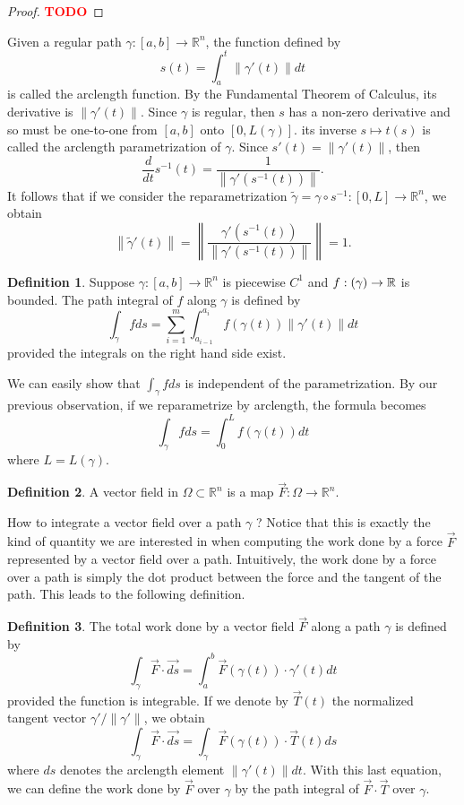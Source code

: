 \documentclass{article}
\theoremstyle{plain}
\theoremstyle{definition}
\newtheorem*{definition}{Definition}
\newcommand{\R}{\mathbb{R}}
\let\Im\relax
\DeclareMathOperator{\Im}{Im}
\newcommand{\td}{\textcolor{red}{\textbf{TODO}}}
\newcommand{\norm}[1]{\left\lVert#1 \right\rVert}
\begin{document}
\begin{proof}
    \td 
\end{proof}

Given a regular path $\gamma : [a,b] \to \R^n$, the function defined by
$$s(t) = \int_{a}^{t}\norm{\gamma'(t)}dt$$
is called the arclength function. By the Fundamental Theorem of Calculus, its derivative is $\norm{\gamma'(t)}$. Since $\gamma$ is regular, then $s$ has a non-zero derivative and so must be one-to-one from $[a,b]$ onto $[0, L(\gamma)]$. its inverse $s \mapsto t(s)$ is called the arclength parametrization of $\gamma$. Since $s'(t) = \norm{\gamma'(t)}$, then
$$\frac{d}{dt}s^{-1}(t) = \frac{1}{\norm{\gamma'(s^{-1}(t))}}.$$
It follows that if we consider the reparametrization $\tilde\gamma = \gamma \circ s^{-1} : [0,L] \to \R^n$, we obtain
$$\norm{\tilde\gamma'(t)} = \norm{\frac{\gamma'(s^{-1}(t))}{\norm{\gamma'(s^{-1}(t))}}} = 1.$$

\begin{definition}
    Suppose $\gamma : [a,b] \to \R^n$ is piecewise $C^1$ and $f : \Im (\gamma) \to \R$ is bounded. The path integral of $f$ along $\gamma$ is defined by
    $$\int_{\gamma}fds = \sum_{i=1}^{m}\int_{a_{i-1}}^{a_{i}}f(\gamma(t))\norm{\gamma'(t)}dt$$
    provided the integrals on the right hand side exist.
\end{definition}

We can easily show that $\int_{\gamma}fds$ is independent of the parametrization. By our previous observation, if we reparametrize by arclength, the formula becomes
$$\int_{\gamma}fds = \int_{0}^{L}f(\gamma(t))dt$$
where $L = L(\gamma)$.

\begin{definition}
    A vector field in $\Omega \subset \R^n$ is a map $\vec{F} : \Omega \to \R^n$.
\end{definition}

How to integrate a vector field over a path $\gamma$ ? Notice that this is exactly the kind of quantity we are interested in when computing the work done by a force $\vec{F}$ represented by a vector field over a path. Intuitively, the work done by a force over a path is simply the dot product between the force and the tangent of the path. This leads to the following definition.

\begin{definition}
    The total work done by a vector field $\vec{F}$ along a path $\gamma$ is defined by
    $$\int_{\gamma}\vec{F} \cdot \vec{ds} = \int_{a}^{b}\vec{F}(\gamma(t))\cdot \gamma'(t)dt$$
    provided the function is integrable. If we denote by $\vec{T}(t)$ the normalized tangent vector $\gamma' / \norm{\gamma'}$, we obtain
    $$\int_{\gamma}\vec{F} \cdot \vec{ds} = \int_{\gamma}\vec{F}(\gamma(t))\cdot \vec{T}(t)ds$$
    where $ds$ denotes the arclength element $\norm{\gamma'(t)}dt$. With this last equation, we can define the work done by $\vec{F}$ over $\gamma$ by the path integral of $\vec{F} \cdot \vec{T}$ over $\gamma$.
\end{definition}
\end{document}
